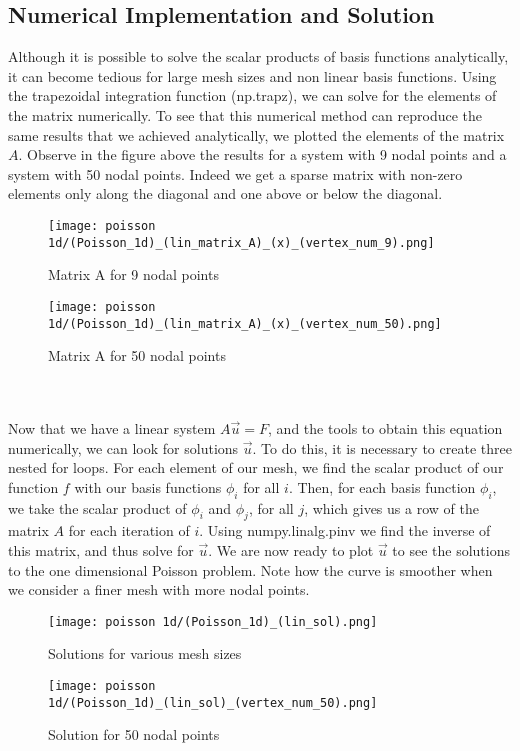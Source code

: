 \documentclass{article}
\begin{document}
\subsection{Numerical Implementation and Solution}
Although it is possible to solve the scalar products of basis functions analytically, it can become tedious for large mesh sizes and non linear basis functions. Using the trapezoidal integration function (np.trapz), we can solve for the elements of the matrix numerically. To see that this numerical method can reproduce the same results that we achieved analytically, we plotted the elements of the matrix $A$. Observe in the figure above the results for a system with 9 nodal points and a system with 50 nodal points. Indeed we get a sparse matrix with non-zero elements only along the diagonal and one above or below the diagonal.
\begin{figure}[hbt!]
\centering
\begin{minipage}{.5\textwidth}
    \centering
    \texttt{[image: poisson 1d/(Poisson\_1d)\_(lin\_matrix\_A)\_(x)\_(vertex\_num\_9).png]}
    \caption{Matrix A for 9 nodal points}
    \label{fig:Matrix A for 9 nodal points}

\end{minipage}%
\begin{minipage}{.5\textwidth}
    \centering
    \texttt{[image: poisson 1d/(Poisson\_1d)\_(lin\_matrix\_A)\_(x)\_(vertex\_num\_50).png]}
    \caption{Matrix A for 50 nodal points}
    \label{fig:Matrix A for 50 nodal points}

\end{minipage}
\end{figure}
\\
\\
Now that we have a linear system $A \vec{u} = F$, and the tools to obtain this equation numerically, we can look for solutions $\vec{u}$. To do this, it is necessary to create three nested for loops. For each element of our mesh, we find the scalar product of our function $f$ with our basis functions $\phi_i$ for all $i$. Then, for each basis function $\phi_i$, we take the scalar product of $\phi_i$ and $\phi_j$, for all $j$, which gives us a row of the matrix $A$ for each iteration of $i$. Using numpy.linalg.pinv we find the inverse of this matrix, and thus solve for $\vec{u}$. We are now ready to plot $\vec{u}$ to see the solutions to the one dimensional Poisson problem. Note how the curve is smoother when we consider a finer mesh with more nodal points. 
\begin{figure}[hbt!]
\centering
\begin{minipage}{.5\textwidth}
    \centering
    \texttt{[image: poisson 1d/(Poisson\_1d)\_(lin\_sol).png]}
    \caption{Solutions for various mesh sizes}
    \label{fig:Solution for given nodal points}

\end{minipage}%
\begin{minipage}{.5\textwidth}
    \centering
    \texttt{[image: poisson 1d/(Poisson\_1d)\_(lin\_sol)\_(vertex\_num\_50).png]}
    \caption{Solution for 50 nodal points}
    \label{fig:Solution for 50 nodal points}

\end{minipage}
\end{figure}
\end{document}
